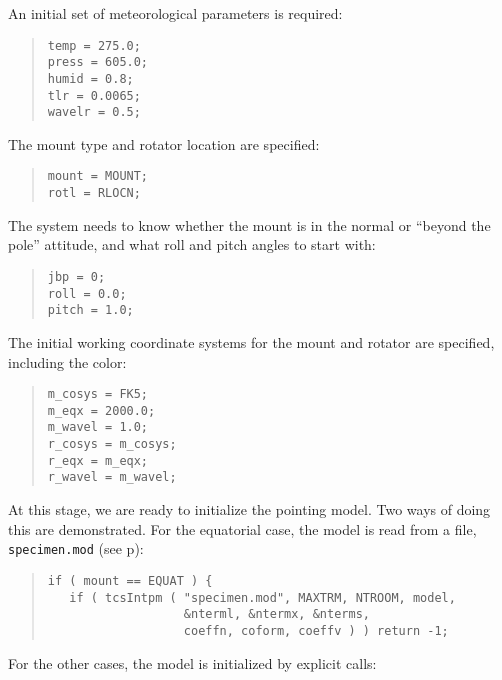 \documentclass[12pt,fleqn,twoside]{article}
\renewcommand{\_}{{\tt\char'137}}     %
\begin{document}
An initial set of meteorological parameters is required:
\begin{quote}
\begin{small}
\begin{verbatim}
temp = 275.0;
press = 605.0;
humid = 0.8;
tlr = 0.0065;
wavelr = 0.5;
\end{verbatim}\end{small}
\end{quote}
The mount type and rotator location are specified:
\begin{quote}
\begin{small}
\begin{verbatim}
mount = MOUNT;
rotl = RLOCN;
\end{verbatim}\end{small}
\end{quote}
The system needs to know whether the mount is in the normal or
``beyond the pole'' attitude, and what roll and pitch angles
to start with:
\begin{quote}
\begin{small}
\begin{verbatim}
jbp = 0;
roll = 0.0;
pitch = 1.0;
\end{verbatim}\end{small}
\end{quote}
The initial working coordinate systems for the mount and rotator
are specified, including the color:
\begin{quote}
\begin{small}
\begin{verbatim}
m_cosys = FK5;
m_eqx = 2000.0;
m_wavel = 1.0;
r_cosys = m_cosys;
r_eqx = m_eqx;
r_wavel = m_wavel;
\end{verbatim}\end{small}
\end{quote}
At this stage, we are ready to initialize the pointing model.  Two ways
of doing this are demonstrated.  For the equatorial case, the model is
read from a file, {\tt specimen.mod} (see p\pageref{specimendotmod}):
\begin{quote}
\begin{small}
\begin{verbatim}
if ( mount == EQUAT ) {
   if ( tcsIntpm ( "specimen.mod", MAXTRM, NTROOM, model,
                   &nterml, &ntermx, &nterms,
                   coeffn, coform, coeffv ) ) return -1;
\end{verbatim}\end{small}
\end{quote}
For the other cases, the model is initialized by explicit calls:
\end{document}

